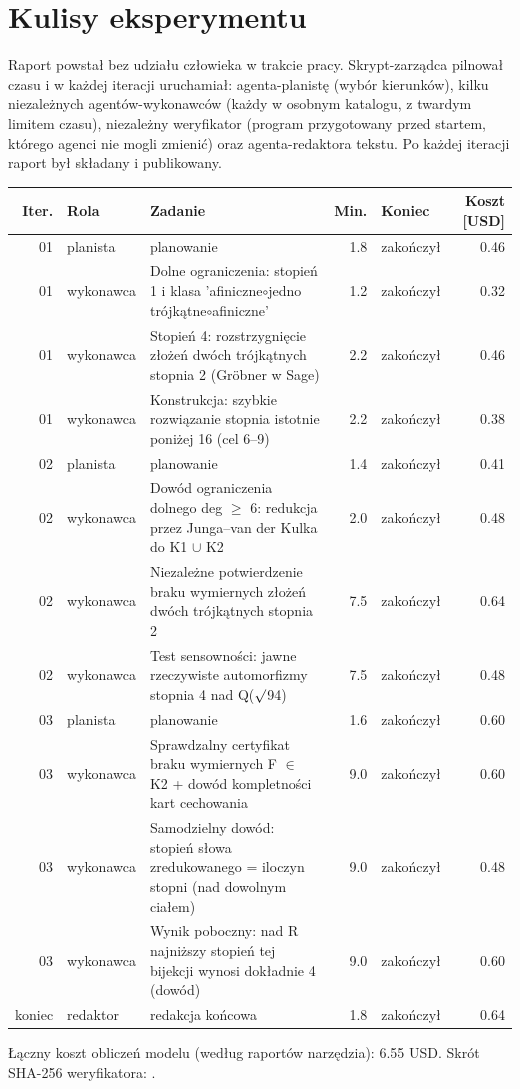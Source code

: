 \section{Kulisy eksperymentu}
Raport powstał bez udziału człowieka w trakcie pracy. Skrypt-zarządca pilnował czasu i w każdej iteracji uruchamiał: agenta-planistę (wybór kierunków), kilku niezależnych agentów-wykonawców (każdy w osobnym katalogu, z twardym limitem czasu), niezależny weryfikator (program przygotowany przed startem, którego agenci nie mogli zmienić) oraz agenta-redaktora tekstu. Po każdej iteracji raport był składany i publikowany.

\begin{center}\small\begin{longtable}{rlp{6.2cm}rlr}\toprule Iter. & Rola & Zadanie & Min. & Koniec & Koszt [USD]\\\midrule\endhead
01 & planista & planowanie  & 1.8 & zakończył & 0.46\\
01 & wykonawca & Dolne ograniczenia: stopień 1 i klasa 'afiniczne\ensuremath{\circ}jedno trójkątne\ensuremath{\circ}afiniczne'  & 1.2 & zakończył & 0.32\\
01 & wykonawca & Stopień 4: rozstrzygnięcie złożeń dwóch trójkątnych stopnia 2 (Gröbner w Sage)  & 2.2 & zakończył & 0.46\\
01 & wykonawca & Konstrukcja: szybkie rozwiązanie stopnia istotnie poniżej 16 (cel 6–9)  & 2.2 & zakończył & 0.38\\
02 & planista & planowanie  & 1.4 & zakończył & 0.41\\
02 & wykonawca & Dowód ograniczenia dolnego deg \ensuremath{\ge} 6: redukcja przez Junga–van der Kulka do K1 \ensuremath{\cup} K2  & 2.0 & zakończył & 0.48\\
02 & wykonawca & Niezależne potwierdzenie braku wymiernych złożeń dwóch trójkątnych stopnia 2  & 7.5 & zakończył & 0.64\\
02 & wykonawca & Test sensowności: jawne rzeczywiste automorfizmy stopnia 4 nad Q(\ensuremath{\surd}94)  & 7.5 & zakończył & 0.48\\
03 & planista & planowanie  & 1.6 & zakończył & 0.60\\
03 & wykonawca & Sprawdzalny certyfikat braku wymiernych F \ensuremath{\in} K2 + dowód kompletności kart cechowania  & 9.0 & zakończył & 0.60\\
03 & wykonawca & Samodzielny dowód: stopień słowa zredukowanego = iloczyn stopni (nad dowolnym ciałem)  & 9.0 & zakończył & 0.48\\
03 & wykonawca & Wynik poboczny: nad R najniższy stopień tej bijekcji wynosi dokładnie 4 (dowód)  & 9.0 & zakończył & 0.60\\
koniec & redaktor & redakcja końcowa  & 1.8 & zakończył & 0.64\\
\bottomrule\end{longtable}\end{center}
Łączny koszt obliczeń modelu (według raportów narzędzia): 6.55 USD. Skrót SHA-256 weryfikatora: \texttt{\hashWeryfikatora}.

